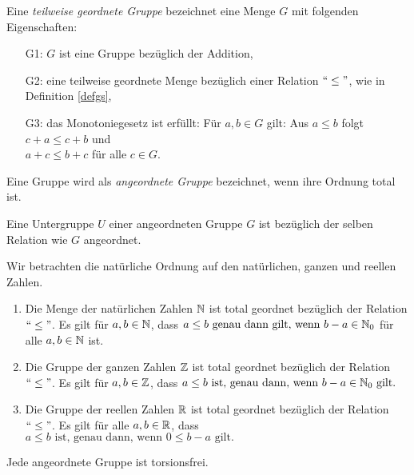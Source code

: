 %
\begin{defn}\label{twgG} %
Eine \textit{teilweise geordnete Gruppe} bezeichnet eine Menge $G$ mit folgenden Eigenschaften: 
%
\begin{enumerate}
\item[G1:] $G$ ist eine Gruppe bezüglich der Addition,
\item[G2:] eine teilweise geordnete Menge bezüglich einer Relation $``\leq " $, wie in Definition \ref{defgs}, 
\item[G3:] das Monotoniegesetz ist erfüllt: Für $a, b \in  G$ gilt: Aus $a \leq b$ folgt $c + a \leq  c + b$ und \\ $a + c \leq b+ c$ für alle $c \in G$.
\end{enumerate}
% 
\end{defn}
%
%
\begin{defn}\label{agG}
Eine Gruppe wird als \textit{angeordnete Gruppe} bezeichnet, wenn ihre Ordnung total ist.
\end{defn}
%
%
%
\begin{bsp}\label{beispielUntergruppeAngeordnet}
Eine Untergruppe $U$ einer angeordneten Gruppe $G$ ist bezüglich der selben Relation wie $G$ angeordnet.
\end{bsp}
%
\begin{bsp}\label{OrdnungNundZ}
Wir betrachten die natürliche Ordnung auf den natürlichen, ganzen und reellen Zahlen.
\begin{enumerate}
\item Die Menge der natürlichen Zahlen $\mathbb{N}$ ist total geordnet bezüglich der Relation $``\leq "$. Es gilt für $a, b \in \mathbb{N}$, dass $ a \leq b \text{ genau dann gilt, wenn } b-a \in \mathbb{N}_0$
für alle $a,b \in \mathbb{N}$ ist.
\item Die Gruppe der ganzen Zahlen $\mathbb{Z}$ ist total geordnet bezüglich der Relation $``\leq "$. Es gilt für $a, b \in \mathbb{Z}$, dass $a\leq b \text{ ist, genau dann, wenn } b -a \in \mathbb{N}_0 \text{ gilt.}$
\item Die Gruppe der reellen Zahlen $\mathbb{R}$ ist total geordnet bezüglich der Relation $``\leq "$. Es gilt für alle $a, b \in \mathbb{R}$, dass $a \leq b \text{ ist, genau dann, wenn } 0 \leq b -a \text{ gilt.} $
\end{enumerate}
\end{bsp}
%
% 
%
%
\begin{bem} \label{angeordnetFolgtTorsionsfrei} %
Jede angeordnete Gruppe ist torsionsfrei. 
\end{bem}
%
